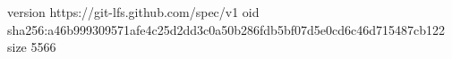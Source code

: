 version https://git-lfs.github.com/spec/v1
oid sha256:a46b999309571afe4c25d2dd3c0a50b286fdb5bf07d5e0cd6c46d715487cb122
size 5566
